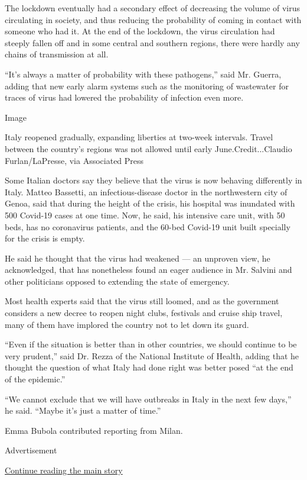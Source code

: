 The lockdown eventually had a secondary effect of decreasing the volume
of virus circulating in society, and thus reducing the probability of
coming in contact with someone who had it. At the end of the lockdown,
the virus circulation had steeply fallen off and in some central and
southern regions, there were hardly any chains of transmission at all.

``It's always a matter of probability with these pathogens,'' said Mr.
Guerra, adding that new early alarm systems such as the monitoring of
wastewater for traces of virus had lowered the probability of infection
even more.

Image

Italy reopened gradually, expanding liberties at two-week intervals.
Travel between the country's regions was not allowed until early
June.Credit...Claudio Furlan/LaPresse, via Associated Press

Some Italian doctors say they believe that the virus is now behaving
differently in Italy. Matteo Bassetti, an infectious-disease doctor in
the northwestern city of Genoa, said that during the height of the
crisis, his hospital was inundated with 500 Covid-19 cases at one time.
Now, he said, his intensive care unit, with 50 beds, has no coronavirus
patients, and the 60-bed Covid-19 unit built specially for the crisis is
empty.

He said he thought that the virus had weakened --- an unproven view, he
acknowledged, that has nonetheless found an eager audience in Mr.
Salvini and other politicians opposed to extending the state of
emergency.

Most health experts said that the virus still loomed, and as the
government considers a new decree to reopen night clubs, festivals and
cruise ship travel, many of them have implored the country not to let
down its guard.

``Even if the situation is better than in other countries, we should
continue to be very prudent,'' said Dr. Rezza of the National Institute
of Health, adding that he thought the question of what Italy had done
right was better posed ``at the end of the epidemic.''

``We cannot exclude that we will have outbreaks in Italy in the next few
days,'' he said. ``Maybe it's just a matter of time.''

Emma Bubola contributed reporting from Milan.

Advertisement

\protect\hyperlink{after-bottom}{Continue reading the main story}

